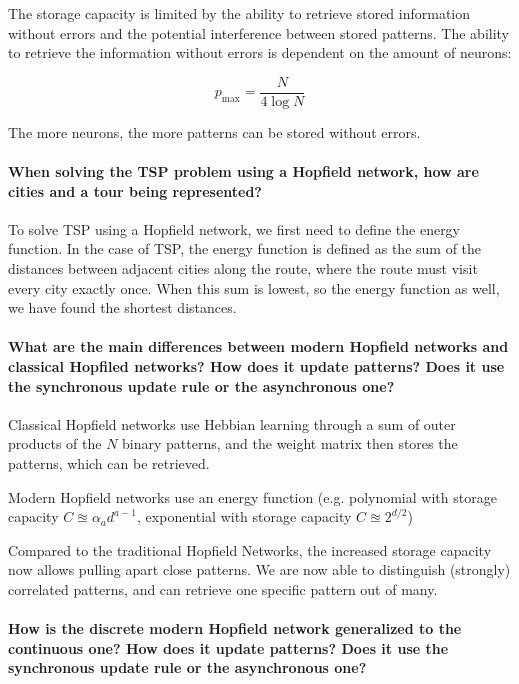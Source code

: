 The storage capacity is limited by the ability to retrieve stored information without errors and the
potential interference between stored patterns. The ability to retrieve the information without errors
is dependent on the amount of neurons:

$$p_\text{max} = \frac{N}{4 \log{N}}$$

The more neurons, the more patterns can be stored without errors.

\paragraph{When solving the TSP problem using a Hopfield network, how are cities and a tour being represented?}

To solve TSP using a Hopfield network, we first need to define the energy function. In the case of TSP,
the energy function is defined as the sum of the distances between adjacent cities along the route,
where the route must visit every city exactly once. When this sum is lowest, so the energy function as
well, we have found the shortest distances.

\paragraph{What are the main differences between modern Hopfield networks and classical Hopfiled networks?
How does it update patterns?
Does it use the synchronous update rule or the asynchronous one?}

Classical Hopfield networks use Hebbian learning through a sum of outer products of the $N$ binary patterns, and the weight matrix then stores the patterns, which can be retrieved.

Modern Hopfield networks use an energy function (e.g. polynomial with storage capacity $C \approxeq \alpha_a d^{a-1}$, exponential with storage capacity $C \approxeq 2^{d / 2}$)

Compared to the traditional Hopfield Networks, the increased storage
capacity now allows pulling apart close patterns.
We are now able to distinguish (strongly) correlated patterns, and can
retrieve one specific pattern out of many.
\citep{demircigil2017mhn,krotov2016denseassociativememorypattern}

\paragraph{How is the discrete modern Hopfield network generalized to the continuous one?
How does it update patterns?
Does it use the synchronous update rule or the asynchronous one?}

